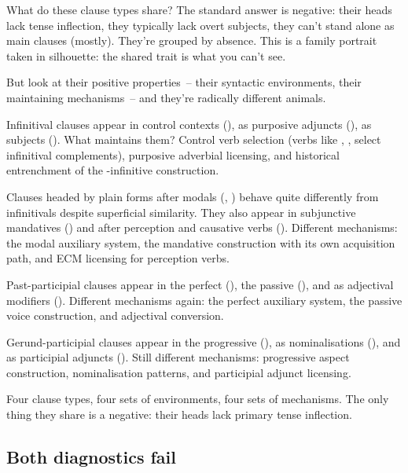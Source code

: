 What do these clause types share? The standard answer is negative: their heads lack tense inflection, they typically lack overt subjects, they can't stand alone as main clauses (mostly). They're grouped by absence. This is a family portrait taken in silhouette: the shared trait is what you can't see.

But look at their positive properties~-- their syntactic environments, their maintaining mechanisms~-- and they're radically different animals.

Infinitival clauses appear in control contexts (), as purposive adjuncts (), as subjects (). What maintains them? Control verb selection (verbs like , ,  select infinitival complements), purposive adverbial licensing, and historical entrenchment of the -infinitive construction.

Clauses headed by plain forms after modals (, ) behave quite differently from infinitivals despite superficial similarity. They also appear in subjunctive mandatives () and after perception and causative verbs (). Different mechanisms: the modal auxiliary system, the mandative construction with its own acquisition path, and ECM licensing for perception verbs.

Past-participial clauses appear in the perfect (), the passive (), and as adjectival modifiers (). Different mechanisms again: the perfect auxiliary system, the passive voice construction, and adjectival conversion.

Gerund-participial clauses appear in the progressive (), as nominalisations (), and as participial adjuncts (). Still different mechanisms: progressive aspect construction, nominalisation patterns, and participial adjunct licensing.

Four clause types, four sets of environments, four sets of mechanisms. The only thing they share is a negative: their heads lack primary tense inflection.

\subsection{Both diagnostics fail}
\label{sec:8:both-fail}

